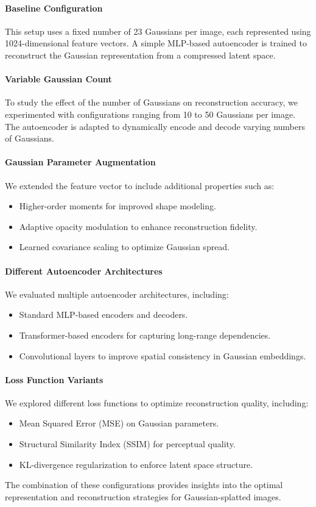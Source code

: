 \paragraph{Baseline Configuration} 
This setup uses a fixed number of 23 Gaussians per image, each represented using 1024-dimensional feature vectors. A simple MLP-based autoencoder is trained to reconstruct the Gaussian representation from a compressed latent space.

\paragraph{Variable Gaussian Count}
To study the effect of the number of Gaussians on reconstruction accuracy, we experimented with configurations ranging from 10 to 50 Gaussians per image. The autoencoder is adapted to dynamically encode and decode varying numbers of Gaussians.

\paragraph{Gaussian Parameter Augmentation}
We extended the feature vector to include additional properties such as:
\begin{itemize}
    \item Higher-order moments for improved shape modeling.
    \item Adaptive opacity modulation to enhance reconstruction fidelity.
    \item Learned covariance scaling to optimize Gaussian spread.
\end{itemize}

\paragraph{Different Autoencoder Architectures} 
We evaluated multiple autoencoder architectures, including:
\begin{itemize}
    \item Standard MLP-based encoders and decoders.
    \item Transformer-based encoders for capturing long-range dependencies.
    \item Convolutional layers to improve spatial consistency in Gaussian embeddings.
\end{itemize}

\paragraph{Loss Function Variants} 
We explored different loss functions to optimize reconstruction quality, including:
\begin{itemize}
    \item Mean Squared Error (MSE) on Gaussian parameters.
    \item Structural Similarity Index (SSIM) for perceptual quality.
    \item KL-divergence regularization to enforce latent space structure.
\end{itemize}

The combination of these configurations provides insights into the optimal representation and reconstruction strategies for Gaussian-splatted images.
